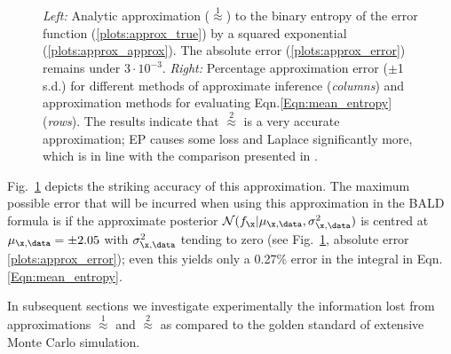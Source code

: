 \begin{figure}

	\caption[Taylor series approximation to the value of information in GP classification]{\emph{Left:} Analytic approximation ({\scriptsize $\stackrel{1}{\approx}$}) to the binary entropy of the error function (\ref{plots:approx_true}) by a squared exponential (\ref{plots:approx_approx}). The absolute error (\ref{plots:approx_error}) remains under $3\cdot 10^{-3}$. \emph{Right:} Percentage approximation error ($\pm$1 s.d.) for different methods of approximate inference (\emph{columns}) and approximation methods for evaluating Eqn.\eqref{Eqn:mean_entropy} (\emph{rows}). The results indicate that {\scriptsize $\stackrel{2}{\approx}$} is a very accurate approximation; EP causes some loss and Laplace significantly more, which is in line with the comparison presented in \citep{Kuss05}. }\label{fig:trick}
\end{figure}

Fig.\ \ref{fig:trick} depicts the striking accuracy of this approximation. The maximum possible error that will be incurred when using this approximation in the BALD formula is if the approximate posterior $\mathcal{N}(f_{\x}\vert \mu_{\x,\data},\sigma_{\x,\data}^2)$ is centred at $\mu_{\x,\data}=\pm 2.05$  with $\sigma_{\x,\data}^2$ tending to zero (see Fig.\ \ref{fig:trick}, absolute error \ref{plots:approx_error}); even this yields only a 0.27\% error in the integral in Eqn.\eqref{Eqn:mean_entropy}.

In subsequent sections we investigate experimentally the information lost from approximations {\scriptsize $\stackrel{1}{\approx}$} and {\scriptsize $\stackrel{2}{\approx}$} as compared to the golden standard of extensive Monte Carlo simulation.

